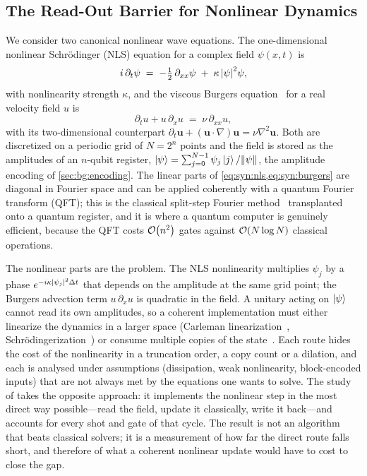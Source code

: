 \subsection{The Read-Out Barrier for Nonlinear Dynamics}\label{sec:syn:waves-problem}

We consider two canonical nonlinear wave equations. The one-dimensional nonlinear Schr\"odinger (NLS) equation for a complex field $\psi(x,t)$ is
\begin{equation}\label{eq:syn:nls}
  i\,\partial_t\psi \;=\; -\tfrac{1}{2}\,\partial_{xx}\psi \;+\; \kappa\,\abs{\psi}^{2}\psi ,
\end{equation}
with nonlinearity strength $\kappa$, and the viscous Burgers equation~\cite{burgers1948turbulence} for a real velocity field $u$ is
\begin{equation}\label{eq:syn:burgers}
  \partial_t u + u\,\partial_x u \;=\; \nu\,\partial_{xx}u ,
\end{equation}
with its two-dimensional counterpart $\partial_t \mathbf{u}+(\mathbf{u}\cdot\nabla)\mathbf{u}=\nu\nabla^{2}\mathbf{u}$. Both are discretized on a periodic grid of $N=2^{n}$ points and the field is stored as the amplitudes of an $n$-qubit register, $\ket{\psi}=\sum_{j=0}^{N-1}\psi_j\ket{j}/\norm{\psi}$, the amplitude encoding of \cref{sec:bg:encoding}. The linear parts of \cref{eq:syn:nls,eq:syn:burgers} are diagonal in Fourier space and can be applied coherently with a quantum Fourier transform (QFT); this is the classical split-step Fourier method~\cite{weideman1986splitstep} transplanted onto a quantum register, and it is where a quantum computer is genuinely efficient, because the QFT costs $\mathcal{O}\!\left(n^{2}\right)$ gates against $\mathcal{O}\!\left(N\log N\right)$ classical operations.

The nonlinear parts are the problem. The NLS nonlinearity multiplies $\psi_j$ by a phase $e^{-i\kappa\abs{\psi_j}^{2}\Delta t}$ that depends on the amplitude at the same grid point; the Burgers advection term $u\,\partial_x u$ is quadratic in the field. A unitary acting on $\ket{\psi}$ cannot read its own amplitudes, so a coherent implementation must either linearize the dynamics in a larger space (Carleman linearization~\cite{liu2021carleman}, Schr\"odingerization~\cite{jin2024schrodingerization}) or consume multiple copies of the state~\cite{lloyd2020nonlinear}. Each route hides the cost of the nonlinearity in a truncation order, a copy count or a dilation, and each is analysed under assumptions (dissipation, weak nonlinearity, block-encoded inputs) that are not always met by the equations one wants to solve. The study of \cite{guo2026nonlinearwaves} takes the opposite approach: it implements the nonlinear step in the most direct way possible---read the field, update it classically, write it back---and accounts for every shot and gate of that cycle. The result is not an algorithm that beats classical solvers; it is a measurement of how far the direct route falls short, and therefore of what a coherent nonlinear update would have to cost to close the gap.

